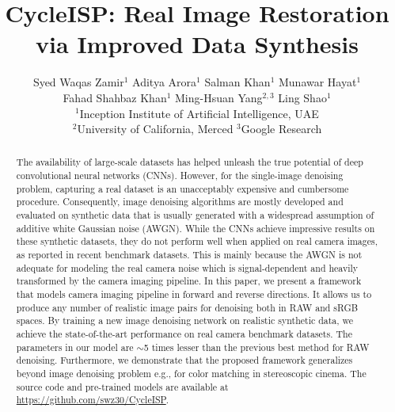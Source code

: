 \documentclass[10pt,twocolumn,letterpaper]{article}
\title{\vspace{-0.7em}CycleISP: Real Image Restoration via Improved Data Synthesis}
\begin{document}
\author{Syed Waqas Zamir$^{1}$ \quad Aditya Arora$^{1}$ \quad Salman Khan$^{1}$ \quad Munawar Hayat$^{1}$ \\ 
Fahad Shahbaz Khan$^{1}$  \quad Ming-Hsuan Yang$^{2,3}$ \quad Ling Shao$^{1}$ \\
$^1$Inception Institute of Artificial Intelligence,  UAE\\
$^2$University of California, Merced \quad $^3$Google Research 
}

\maketitle


\begin{abstract}\vspace{-1.0em}
The availability of large-scale datasets has helped unleash the true potential of deep convolutional neural networks (CNNs).
However, for the single-image denoising problem, capturing a real dataset is an unacceptably expensive and cumbersome procedure. 
Consequently, image denoising algorithms are mostly developed and evaluated on synthetic data that is usually generated with a widespread assumption of additive white Gaussian noise (AWGN). 
While the CNNs achieve impressive results on these synthetic datasets, they do not perform well when applied on real camera images, as reported in recent benchmark datasets. 
This is mainly because the AWGN is not adequate for modeling the real camera noise which is signal-dependent and heavily transformed by the camera imaging pipeline. 
In this paper, we present a framework that models camera imaging pipeline in forward and reverse directions. 
It allows us to produce any number of realistic image pairs for denoising both in RAW and sRGB spaces. 
By training a new image denoising network on realistic synthetic data, we achieve the state-of-the-art performance on real camera benchmark datasets. The parameters in our model are $\sim$5 times lesser than the previous best method for RAW denoising.  
Furthermore, we demonstrate that the proposed framework generalizes beyond image denoising problem e.g., for color matching in stereoscopic cinema.
The source code and pre-trained models are available at \url{https://github.com/swz30/CycleISP}.
\end{abstract}
\vspace{-0.3cm}
\end{document}
